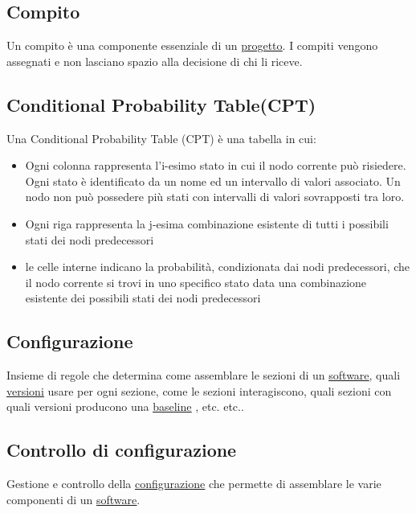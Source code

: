 	
	\subsection{Compito}
	\label{sec:compito}
	Un compito è una componente essenziale di un \underline{\hyperref[sec:progetto]{progetto}}. I compiti vengono assegnati e non lasciano spazio alla decisione di chi li riceve.

	
	\subsection{Conditional Probability Table(CPT)}
	\label{sec:CPT}
	Una Conditional Probability Table (CPT) è una tabella in cui:
		\begin{itemize}
			\item{Ogni colonna rappresenta l'i-esimo stato in cui il nodo corrente può risiedere. Ogni stato è identificato da un nome ed un intervallo di valori associato. Un nodo non può possedere più stati con intervalli di valori sovrapposti tra loro.}
			\item{Ogni riga rappresenta la j-esima combinazione esistente di tutti i possibili stati dei nodi predecessori}
			\item{le celle interne indicano la probabilità, condizionata dai nodi predecessori, che il nodo corrente si trovi in uno specifico stato data una combinazione esistente dei possibili stati dei nodi predecessori}
		\end{itemize}

	
	\subsection{Configurazione}
	\label{sec:configurazione}
	Insieme di regole che determina come assemblare le sezioni di un \underline{\hyperref[sec:prodottosoftware]{software}}, quali \underline{\hyperref[sec:versione]{versioni}} usare per ogni sezione, come le sezioni interagiscono, quali sezioni con quali versioni producono una \underline{\hyperref[sec:baseline]{baseline}} , etc. etc..


	\subsection{Controllo di configurazione}
	\label{sec:controlloconfigurazione}
	Gestione e controllo della \underline{\hyperref[sec:configurazione]{configurazione}} che permette di assemblare le varie componenti di un \underline{\hyperref[sec:prodottosoftware]{software}}.


